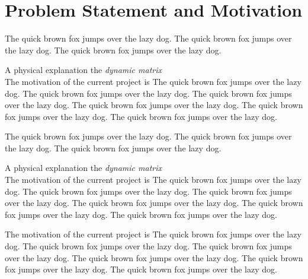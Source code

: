 \documentclass[11pt,a4paper]{report}
\begin{document}
\section{Problem Statement and Motivation}
\label{sec:motivation}

The quick brown fox jumps over the lazy dog. The quick brown fox jumps over the lazy dog. The quick brown fox jumps over the lazy dog.\\
\begin{tcolorbox}
A physical explanation the \emph{dynamic matrix}\\
The motivation of the current project is
The quick brown fox jumps over the lazy dog. The quick brown fox jumps over the lazy dog. The quick brown fox jumps over the lazy dog. The quick brown fox jumps over the lazy dog. The quick brown fox jumps over the lazy dog. The quick brown fox jumps over the lazy dog.\\
\end{tcolorbox}
The quick brown fox jumps over the lazy dog. The quick brown fox jumps over the lazy dog. The quick brown fox jumps over the lazy dog.\\

\begin{tcolorbox}
A physical explanation the 
\emph{dynamic matrix}\\
The motivation of the current project is
The quick brown fox jumps over the lazy dog. The quick brown fox jumps over the lazy dog. The quick brown fox jumps over the lazy dog. The quick brown fox jumps over the lazy dog. The quick brown fox jumps over the lazy dog. The quick brown fox jumps over the lazy dog.
\end{tcolorbox}

The motivation of the current project is The quick brown fox jumps over the lazy dog. The quick brown fox jumps over the lazy dog. The quick brown fox jumps over the lazy dog. The quick brown fox jumps over the lazy dog. The quick brown fox jumps over the lazy dog. The quick brown fox jumps over the lazy dog.\\
\end{document}
